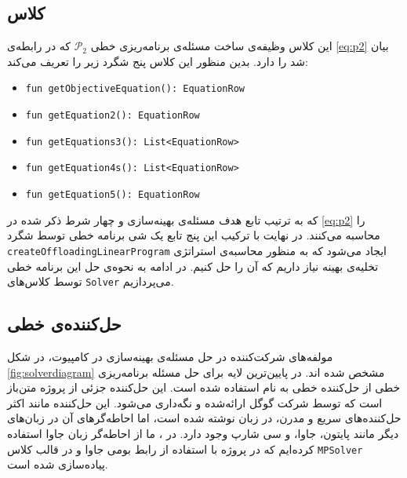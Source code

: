 \subsection{کلاس }
این کلاس وظیفه‌ی ساخت مسئله‌ی برنامه‌ریزی خطی
$\mathcal{P}_2$
که در رابطه‌ی \ref{eq:p2} بیان شد را دارد. بدین منظور این کلاس پنج شگرد زیر را تعریف می‌کند:
\begin{latin}
	\begin{itemize}
		\item \texttt{\footnotesize fun getObjectiveEquation(): EquationRow}
		\item \texttt{\footnotesize fun getEquation2(): EquationRow}
		\item \texttt{\footnotesize fun getEquations3(): List<EquationRow>}
		\item \texttt{\footnotesize fun getEquation4s(): List<EquationRow>}
		\item \texttt{\footnotesize fun getEquation5(): EquationRow}
	\end{itemize}
\end{latin}
که به ترتیب تابع هدف مسئله‌ی بهینه‌سازی و چهار شرط ذکر شده در \ref{eq:p2} را محاسبه می‌کنند. در نهایت با ترکیب این پنج تابع یک شی برنامه خطی توسط شگرد \texttt{\footnotesize createOffloadingLinearProgram} ایجاد می‌شود که به منظور محاسبه‌ی استراتژی تخلیه‌ی بهینه نیاز داریم که آن را حل کنیم. در ادامه به نحوه‌ی حل این برنامه خطی توسط کلاس‌های \texttt{\footnotesize Solver} می‌پردازیم.
\subsection{حل‌کننده‌ی خطی}
مولفه‌های شرکت‌کننده در حل مسئله‌ی بهینه‌سازی در کامپیوت، در شکل \ref{fig:solverdiagram} مشخص شده اند. در پایین‌ترین لایه برای حل مسئله برنامه‌ریزی خطی از حل‌کننده خطی به نام  استفاده شده است. این حل‌کننده جزئی از پروژه متن‌باز  است که توسط شرکت گوگل ارائه‌شده و نگه‌داری می‌شود. \Cite{glop} این حل‌کننده مانند اکثر حل‌کننده‌های سریع و مدرن، در زبان  نوشته شده است، اما احاطه‌گرهای آن در زبان‌های دیگر مانند پایتون، جاوا، و سی شارپ وجود دارد. در \CurrentProject، ما از احاطه‌گر زبان جاوا استفاده کرده‌ایم که در پروژه  با استفاده از رابط بومی جاوا و در قالب کلاس \texttt{\footnotesize MPSolver} پیاده‌سازی شده است. \\

